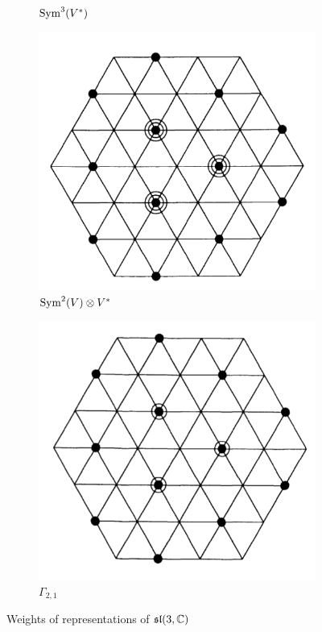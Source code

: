 \documentclass{report}
\begin{document}
\begin{figure}[h]
\begin{subfigure}[b]{0.3\textwidth}
        \caption{$\operatorname{Sym}^3(V^*)$}
        \label{fig:sl_3_C_weights_symmetric_cube_dual}
    \end{subfigure}
    \hfill
    \begin{subfigure}[b]{0.3\textwidth}
        \centering
        \includegraphics[width=\textwidth]{sl_3_C_weights_sym_square_tensor_dual.png}
        \caption{$\operatorname{Sym}^2(V) \otimes V^*$}
        \label{fig:sl_3_C_weights_sym_square_tensor_dual}
    \end{subfigure}
    \hfill
    \begin{subfigure}[b]{0.3\textwidth}
        \centering
        \includegraphics[width=\textwidth]{sl_3_C_weights_G_2_1.png}
        \caption{$\Gamma_{2,1}$}
        \label{fig:sl_3_C_weights_G_2_1}
    \end{subfigure}
    \caption{Weights of representations of $\operatorname{{\mathfrak{sl}}}(3, \mathbb C)$}
    \label{fig:sl_3_C_weights}
\end{figure}
\end{document}
